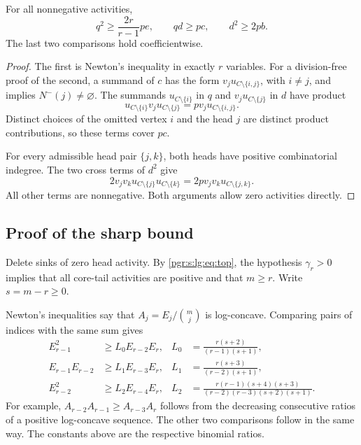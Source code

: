 \documentclass[11pt]{article}
\numberwithin{equation}{section}
\theoremstyle{definition}\newtheorem{definition}[theorem]{Definition}\newtheorem{remark}[theorem]{Remark}
\begin{document}
\begin{lemma}\label{pgr:s:lg:lem:core}
For all nonnegative activities,
\begin{equation}\label{pgr:s:lg:eq:core}
 q^2\ge\frac{2r}{r-1}pe,\qquad qd\ge pc,\qquad d^2\ge2pb.
\end{equation}
The last two comparisons hold coefficientwise.
\end{lemma}
\begin{proof}
The first is Newton's inequality in exactly $r$ variables. For a division-free proof of the second, a summand of $c$ has the form $v_j u_{C\setminus\{i,j\}}$, with $i\ne j$, and implies $N^-(j)\ne\varnothing$. The summands $u_{C\setminus\{i\}}$ in $q$ and $v_j u_{C\setminus\{j\}}$ in $d$ have product
\[
 u_{C\setminus\{i\}}v_j u_{C\setminus\{j\}}
   =p v_j u_{C\setminus\{i,j\}}.
\]
Distinct choices of the omitted vertex $i$ and the head $j$ are distinct product contributions, so these terms cover $pc$.

For every admissible head pair $\{j,k\}$, both heads have positive combinatorial indegree. The two cross terms of $d^2$ give
\[
 2v_jv_k u_{C\setminus\{j\}}u_{C\setminus\{k\}}
   =2p v_jv_k u_{C\setminus\{j,k\}}.
\]
All other terms are nonnegative. Both arguments allow zero activities directly.
\end{proof}

\subsection{Proof of the sharp bound}
Delete sinks of zero head activity. By \eqref{pgr:s:lg:eq:top}, the hypothesis $\gamma_r>0$ implies that all core-tail activities are positive and that $m\ge r$. Write $s=m-r\ge0$.

Newton's inequalities say that $A_j=E_j/\binom mj$ is log-concave. Comparing pairs of indices with the same sum gives
\begin{align}
 E_{r-1}^2&\ge L_0 E_{r-2}E_r,
 &L_0&=\frac{r(s+2)}{(r-1)(s+1)},\label{pgr:s:lg:eq:L0}\\
 E_{r-1}E_{r-2}&\ge L_1 E_{r-3}E_r,
 &L_1&=\frac{r(s+3)}{(r-2)(s+1)},\label{pgr:s:lg:eq:L1}\\
 E_{r-2}^2&\ge L_2 E_{r-4}E_r,
 &L_2&=\frac{r(r-1)(s+4)(s+3)}{(r-2)(r-3)(s+2)(s+1)}.\label{pgr:s:lg:eq:L2}
\end{align}
For example, $A_{r-2}A_{r-1}\ge A_{r-3}A_r$ follows from the decreasing consecutive ratios of a positive log-concave sequence. The other two comparisons follow in the same way. The constants above are the respective binomial ratios.
\end{document}
